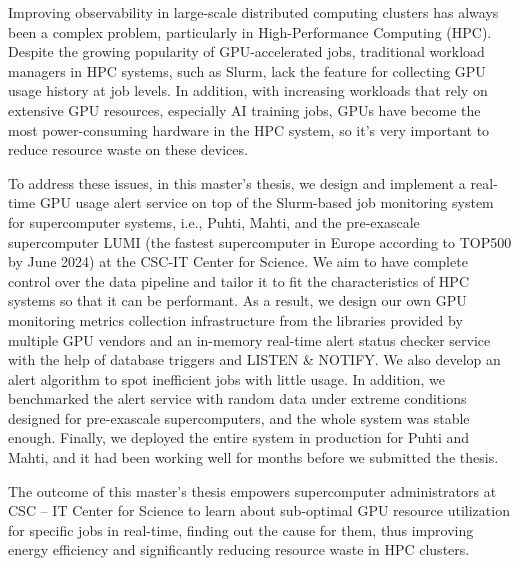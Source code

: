 Improving observability in large-scale distributed computing clusters has always been a complex problem, particularly in High-Performance Computing (HPC). Despite the growing popularity of GPU-accelerated jobs, traditional workload managers in HPC systems, such as Slurm, lack the feature for collecting GPU usage history at job levels. In addition, with increasing workloads that rely on extensive GPU resources, especially AI training jobs, GPUs have become the most power-consuming hardware in the HPC system, so it's very important to reduce resource waste on these devices.

To address these issues, in this master's thesis, we design and implement a real-time GPU usage alert service on top of the Slurm-based job monitoring system for supercomputer systems, i.e., Puhti, Mahti, and the pre-exascale supercomputer LUMI (the fastest supercomputer in Europe according to TOP500 by June 2024) at the CSC-IT Center for Science. We aim to have complete control over the data pipeline and tailor it to fit the characteristics of HPC systems so that it can be performant. As a result, we design our own GPU monitoring metrics collection infrastructure from the libraries provided by multiple GPU vendors and an in-memory real-time alert status checker service with the help of database triggers and LISTEN \& NOTIFY. We also develop an alert algorithm to spot inefficient jobs with little usage. In addition, we benchmarked the alert service with random data under extreme conditions designed for pre-exascale supercomputers, and the whole system was stable enough. Finally, we deployed the entire system in production for Puhti and Mahti, and it had been working well for months before we submitted the thesis.

The outcome of this master's thesis empowers supercomputer administrators at CSC -- IT Center for Science to learn about sub-optimal GPU resource utilization for specific jobs in real-time, finding out the cause for them, thus improving energy efficiency and significantly reducing resource waste in HPC clusters.
